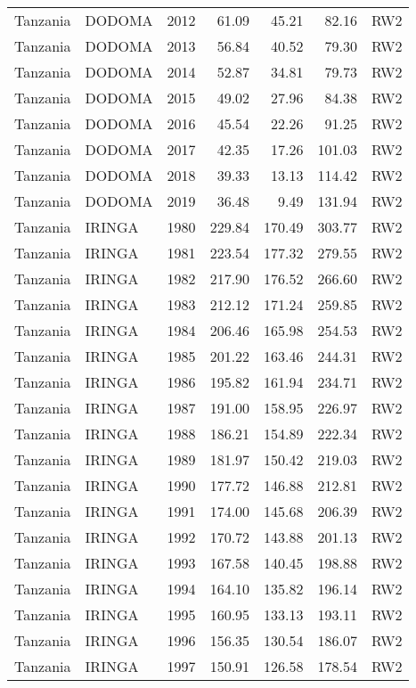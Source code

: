 \begin{longtable}{lllrrrl}
  Tanzania & DODOMA & 2012 & 61.09 & 45.21 & 82.16 & RW2 \\ 
  Tanzania & DODOMA & 2013 & 56.84 & 40.52 & 79.30 & RW2 \\ 
  Tanzania & DODOMA & 2014 & 52.87 & 34.81 & 79.73 & RW2 \\ 
  Tanzania & DODOMA & 2015 & 49.02 & 27.96 & 84.38 & RW2 \\ 
  Tanzania & DODOMA & 2016 & 45.54 & 22.26 & 91.25 & RW2 \\ 
  Tanzania & DODOMA & 2017 & 42.35 & 17.26 & 101.03 & RW2 \\ 
  Tanzania & DODOMA & 2018 & 39.33 & 13.13 & 114.42 & RW2 \\ 
  Tanzania & DODOMA & 2019 & 36.48 & 9.49 & 131.94 & RW2 \\ 
  Tanzania & IRINGA & 1980 & 229.84 & 170.49 & 303.77 & RW2 \\ 
  Tanzania & IRINGA & 1981 & 223.54 & 177.32 & 279.55 & RW2 \\ 
  Tanzania & IRINGA & 1982 & 217.90 & 176.52 & 266.60 & RW2 \\ 
  Tanzania & IRINGA & 1983 & 212.12 & 171.24 & 259.85 & RW2 \\ 
  Tanzania & IRINGA & 1984 & 206.46 & 165.98 & 254.53 & RW2 \\ 
  Tanzania & IRINGA & 1985 & 201.22 & 163.46 & 244.31 & RW2 \\ 
  Tanzania & IRINGA & 1986 & 195.82 & 161.94 & 234.71 & RW2 \\ 
  Tanzania & IRINGA & 1987 & 191.00 & 158.95 & 226.97 & RW2 \\ 
  Tanzania & IRINGA & 1988 & 186.21 & 154.89 & 222.34 & RW2 \\ 
  Tanzania & IRINGA & 1989 & 181.97 & 150.42 & 219.03 & RW2 \\ 
  Tanzania & IRINGA & 1990 & 177.72 & 146.88 & 212.81 & RW2 \\ 
  Tanzania & IRINGA & 1991 & 174.00 & 145.68 & 206.39 & RW2 \\ 
  Tanzania & IRINGA & 1992 & 170.72 & 143.88 & 201.13 & RW2 \\ 
  Tanzania & IRINGA & 1993 & 167.58 & 140.45 & 198.88 & RW2 \\ 
  Tanzania & IRINGA & 1994 & 164.10 & 135.82 & 196.14 & RW2 \\ 
  Tanzania & IRINGA & 1995 & 160.95 & 133.13 & 193.11 & RW2 \\ 
  Tanzania & IRINGA & 1996 & 156.35 & 130.54 & 186.07 & RW2 \\ 
  Tanzania & IRINGA & 1997 & 150.91 & 126.58 & 178.54 & RW2 \\ 

\end{longtable}
